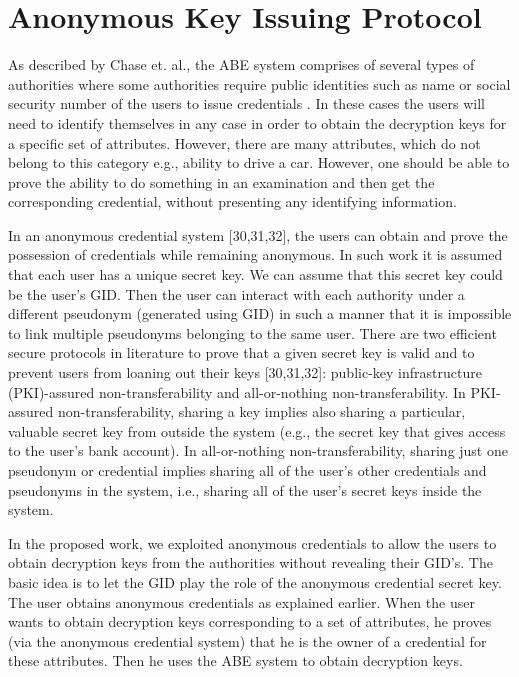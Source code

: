 \documentclass[10pt,journal]{IEEEtran}
\begin{document}
\section{Anonymous Key Issuing Protocol}
As described by Chase et. al., the ABE system comprises of several types of authorities where some authorities require public identities such as name or social security number of the users to issue credentials \cite{imaabe}. In these cases the users will need to identify themselves in any case in order to obtain the decryption keys for a specific set of attributes. However, there are many attributes, which do not belong to this category e.g., ability to drive a car. However, one should be able to prove the ability to do something in an examination and then get the corresponding credential, without presenting any identifying information.

In an anonymous credential system [30,31,32], the users can obtain and prove the possession of credentials while remaining anonymous. In such work it is assumed that each user has a unique secret key. We can assume that this secret key could be the user’s GID. Then the user can interact with each authority under a different pseudonym (generated using GID) in such a manner that it is impossible to link multiple pseudonyms belonging to the same user. There are two efficient secure protocols in literature to prove that a given secret key is valid and to prevent users from loaning out their keys [30,31,32]: public-key infrastructure (PKI)-assured non-transferability and all-or-nothing non-transferability. In PKI-assured non-transferability, sharing a key implies also sharing a particular, valuable secret key from outside the system (e.g., the secret key that gives access to the user's bank account). In all-or-nothing non-transferability, sharing just one pseudonym or credential implies sharing all of the user's other credentials and pseudonyms in the system, i.e., sharing all of the user's secret keys inside the system.

In the proposed work, we exploited anonymous credentials to allow the users to obtain decryption keys from the authorities without revealing their GID’s. The basic idea is to let the GID play the role of the anonymous credential secret key. The user obtains anonymous credentials as explained earlier. When the user wants to obtain decryption keys corresponding to a set of attributes, he proves (via the anonymous credential system) that he is the owner of a credential for these attributes. Then he uses the ABE system to obtain decryption keys.
\end{document}
